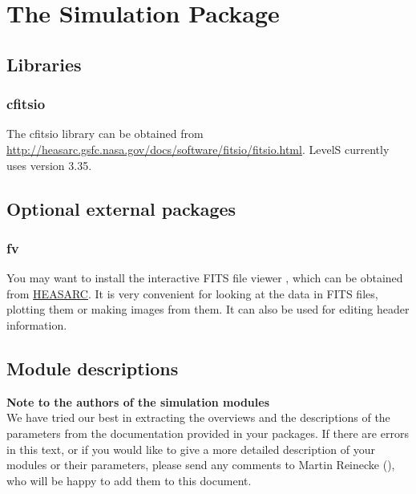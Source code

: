 \section{The Simulation Package}
\subsection{Libraries}

\subsubsection{cfitsio}

The cfitsio library can be obtained from
\href{http://heasarc.gsfc.nasa.gov/docs/software/fitsio/fitsio.html}
{http://heasarc.gsfc.nasa.gov/docs/software/fitsio/fitsio.html}.
LevelS currently uses version 3.35.

\subsection{Optional external packages}
  \subsubsection{fv}
      You may want to install the interactive FITS file viewer
      , which can be obtained from
      \href{http://heasarc.gsfc.nasa.gov/docs/software/ftools/fv}{HEASARC}.
      It is very convenient for looking at the data in FITS files, plotting
      them or making images from them. It can also be used for editing
      header information.


\subsection{Module descriptions}
\textbf{Note to the authors of the simulation modules}\\
We have tried our
best in extracting the overviews and the descriptions of the
parameters from the documentation provided in your packages. If there
are errors in this text, or if you would like to give a more detailed
description of your modules or their parameters, please send any
comments to Martin Reinecke (), who
will be happy to add them to this document.

